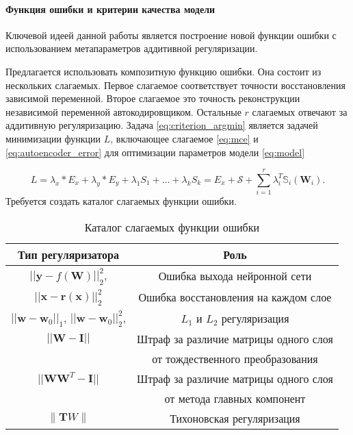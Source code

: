 \documentclass[12pt, twoside]{article}
\newcommand{\xb}{{\mathbf{x}}}
\newcommand{\Smi}{{\mathcal{S}}}
\newcommand{\w}{{\mathbf{W}}}
\newcommand{\wm}{{\mathbf{w}}}
\begin{document}
\paragraph{Функция ошибки и критерии качества модели}

Ключевой идеей данной работы является построение новой функции ошибки с использованием метапараметров аддитивной регуляризации. 

Предлагается использовать композитную функцию ошибки. Она состоит из нескольких слагаемых. Первое слагаемое соответствует точности восстановления зависимой переменной. Второе слагаемое это точность реконструкции независимой переменной автокодировщиком. Остальные $r$ слагаемых отвечают за аддитивную регуляризацию. Задача \eqref{eq:criterion_argmin} является задачей минимизации функции $L$, включающее слагаемое \eqref{eq:mce} и \eqref{eq:autoencoder_error} для оптимизации параметров модели \eqref{eq:model}

\begin{equation}\label{eq:error_function}
L = \lambda_x*E_x + \lambda_y*E_y + \lambda_1S_1+\dots+\lambda_kS_k = E_x + \Smi + \sum\limits_{i = 1}^r\mathbb{\lambda}_i^T\mathbb{S}_i(\mathbf{W}_i).
\end{equation}
Требуется создать каталог слагаемых функции ошибки.
\begin{table}[h!]
\begin{center}
\begin{tabular}{|c|c|}
\hline
  Тип регуляризатора   & Роль  \\
  \hline
  $||\mathbf{y} - f(\w)||^2_2 $,   & Ошибка выхода нейронной сети \\
  \hline
  $||\xb-\mathbf{r}(\xb)||^2_2$ & Ошибка восстановления на каждом слое \\
  \hline
  $||\wm-\wm_0||_1$, $||\wm-\wm_0||^2_2$, & $L_1$ и $L_2$ регуляризация\\
  \hline
  $||\w-\mathbf{I}||$ & Штраф за различие матрицы одного слоя \\
  & от тождественного преобразования \\
  \hline
  $||\w\w^T-\mathbf{I}||$ & Штраф за различие матрицы одного слоя \\
  & от метода главных компонент \\
  \hline
  $\|\mathbf{T}W\|$ & Тихоновская регуляризация\\
  \hline
\end{tabular}
\caption{Каталог слагаемых функции ошибки}
\end{center}
\end{table}
\end{document}
